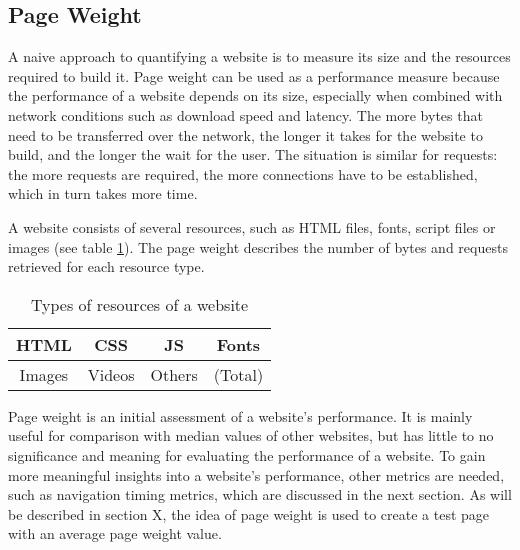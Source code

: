 





\subsection{Page Weight} %
\label{subsection:page_weight}

A naive approach to quantifying a website is to measure its size and the resources required to build it.
Page weight can be used as a performance measure because the performance of a website depends on its size, especially when combined with network conditions such as download speed and latency.
The more bytes that need to be transferred over the network, the longer it takes for the website to build, and the longer the wait for the user.
The situation is similar for requests: the more requests are required, the more connections have to be established, which in turn takes more time.

A website consists of several resources, such as HTML files, fonts, script files or images (see table \ref{table:website_resources}).
The page weight describes the number of bytes and requests retrieved for each resource type. %

\begin{table}[h]
	\small
	\centering
	\begin{tabular}{| c | c | c | c | }
	\hline
	HTML & CSS  & JS & Fonts \\
	\hline
	Images & Videos & Others & (Total) \\
	\hline
	\end{tabular}
	\medskip
	\caption{Types of resources of a website}
	\label{table:website_resources}
\end{table}

Page weight is an initial assessment of a website's performance.
It is mainly useful for comparison with median values of other websites, but has little to no significance and meaning for evaluating the performance of a website.
To gain more meaningful insights into a website's performance, other metrics are needed, such as navigation timing metrics, which are discussed in the next section.
As will be described in section X, the idea of page weight is used to create a test page with an average page weight value.


